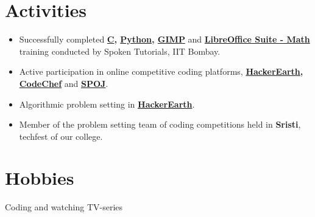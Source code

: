 \documentclass[margin, centered]{res}
\begin{document}
\begin{resume}
\section{Activities}
\begin{itemize}[leftmargin=*]
	\item
	Successfully completed \textbf{\href{https://goo.gl/NxdY6T}{C}, \href{https://goo.gl/mLoMF3}{Python}, \href{https://goo.gl/rQg0Dz}{GIMP}} and \textbf{\href{https://goo.gl/i67WIz}{LibreOffice Suite - Math}} training conducted by Spoken Tutorials, IIT Bombay.
	\item
	Active participation in online competitive coding platforms, \textbf{\href{https://www.hackerearth.com/@abhisek17}{HackerEarth}, \href{https://www.codechef.com/users/abhisek_ch}{CodeChef}} and \textbf{\href{http://www.spoj.com/users/abhisekssp4025/}{SPOJ}}.
	\item
	Algorithmic problem setting in \textbf{\href{https://hackerearth.com}{HackerEarth}}.
	\item
	Member of the problem setting team of coding competitions held in \textbf{Sristi}, techfest of our college.
\end{itemize}

\section{Hobbies}
Coding and watching TV-series
\end{resume}
\end{document}
